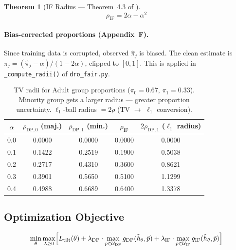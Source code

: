 \documentclass[11pt,a4paper]{article}
\newtheorem{theorem}{Theorem}
\newcommand{\calU}{\mathcal{U}}
\newcommand{\htilde}{\tilde{h}}
\newcommand{\ptilde}{\tilde{p}}
\newcommand{\rDP}[1][]{\rho_{\mathrm{DP}#1}}
\newcommand{\rIF}{\rho_{\mathrm{IF}}}
\newcommand{\lDP}{\lambda_{\mathrm{DP}}}
\newcommand{\lIF}{\lambda_{\mathrm{IF}}}
\newcommand{\gDP}{g_{\mathrm{DP}}}
\newcommand{\gIF}{g_{\mathrm{IF}}}
\newcommand{\Ltilt}{L_{\mathrm{tilt}}}
\begin{document}
\begin{theorem}[IF Radius --- Theorem~4.3 of \citealt{drofair2026}]
\begin{equation}
  \rIF = 2\alpha - \alpha^2
  \label{eq:if_radius}
\end{equation}
\end{theorem}

\paragraph{Bias-corrected proportions (Appendix~F).}
Since training data is corrupted, observed $\hat{\pi}_j$ is biased.
The clean estimate is $\pi_j = (\hat{\pi}_j - \alpha)/(1-2\alpha)$,
clipped to $[0,1]$.  This is applied in \texttt{\_compute\_radii()} of
\texttt{dro\_fair.py}.

\begin{table}[h]
\centering\small
\caption{TV radii for Adult group proportions ($\pi_0=0.67,\,\pi_1=0.33$).
  Minority group gets a larger radius --- greater proportion uncertainty.
  $\ell_1$-ball radius $= 2\rho$ (TV $\to$ $\ell_1$ conversion).}
\label{tab:radii}
\begin{tabular}{ccccc}
\toprule
\rowcolor{hdrblue!90}
\color{white}$\alpha$ &
\color{white}$\rDP[{,0}]$ (maj.) &
\color{white}$\rDP[{,1}]$ (min.) &
\color{white}$\rIF$ &
\color{white}$2\rDP[{,1}]$ ($\ell_1$ radius) \\
\midrule
0.0 & 0.0000 & 0.0000 & 0.0000 & 0.0000 \\
0.1 & 0.1422 & 0.2519 & 0.1900 & 0.5038 \\
0.2 & 0.2717 & 0.4310 & 0.3600 & 0.8621 \\
0.3 & 0.3901 & 0.5650 & 0.5100 & 1.1299 \\
0.4 & 0.4988 & 0.6689 & 0.6400 & 1.3378 \\
\bottomrule
\end{tabular}
\end{table}

\subsection{Optimization Objective}

\begin{equation}
  \min_\theta \max_{\lambda\ge 0}\Bigl[
    \Ltilt(\theta)
    + \lDP\cdot\max_{\ptilde\in\calU_{\mathrm{DP}}}\gDP(\htilde_\theta,\ptilde)
    + \lIF\cdot\max_{\ptilde\in\calU_{\mathrm{IF}}}\gIF(\htilde_\theta,\ptilde)
  \Bigr]
  \label{eq:lagrangian}
\end{equation}
\end{document}
